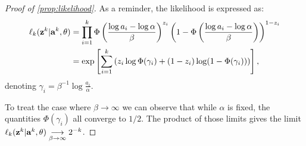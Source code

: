\begin{proof}[Proof of \cref{prop:likelihood}]
    As a reminder, the likelihood is expressed as:
    \begin{equation}
    \begin{aligned}%
        \ell_k(\mbf z^k|\mbf a^k,\theta)  &= \prod_{i=1}^k\Phi\left(\frac{\log a_i-\log\alpha}{\beta}\right)^{z_i}\left(1-\Phi\left(\frac{\log a_i-\log\alpha}{\beta}\right)\right)^{1-z_i} \\
            & = \exp\left[\sum_{i=1}^k\left(z_i\log\Phi(\gamma_i) + (1-z_i)\log(1-\Phi(\gamma_i))\right)\right] ,
    \end{aligned}
\end{equation}
denoting $\gamma_i=\beta^{-1}\log\frac{a_i}{\alpha}$. %

To treat the case where $\beta\to\infty$ we can observe that while $\alpha$ is fixed, the quantities $\Phi(\gamma_i)$ all converge to ${1}/{2}$. The product of those limits gives the limit $\ell_k(\mathbf{z}^k|\mathbf{a}^k,\theta)\overset{\ }{\underset{\beta\rightarrow\infty}{\longrightarrow}}2^{-k}$.



\end{proof}
